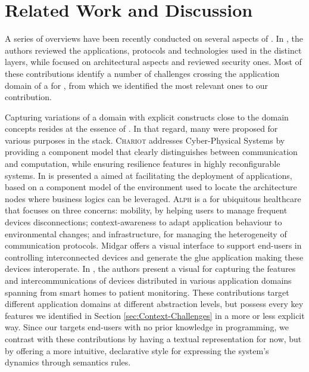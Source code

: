 \section{Related Work and Discussion}
\label{sec:RW}

A series of overviews have been recently conducted on several aspects of \IOT. In \cite{J:AlFuqaha-etAl:2014,xu-14a}, the authors reviewed the applications, protocols and technologies used in the distinct \IOT layers, while \cite{singh-14,gubbi-13} focused on architectural aspects and \cite{tan-10,xu-14b} reviewed security ones. Most of these contributions identify a number of challenges crossing the application domain of a \DSL for \IOT, from which we identified the most relevant ones to our contribution.

Capturing variations of a domain with explicit constructs close to the domain concepts resides at the essence of \DSLS. In that regard, many \DSLS were proposed for various purposes in the \IOT stack. \textsc{Chariot} \cite{Pradhan-etAl:2015} addresses Cyber-Physical Systems by providing a component model that clearly distinguishes between communication and computation, while ensuring resilience features in highly reconfigurable systems. In \cite{Brandzaeg-Mohagheghi-Mosser:2012} is presented a \DSL aimed at facilitating the deployment of applications, based on a component model of the environment used to locate the architecture nodes where business logics can be leveraged. \textsc{Alph} \cite{Munnelly-Clarke:2008} is a \DSL for ubiquitous healthcare that focuses on three concerns: mobility, by helping users to manage frequent devices disconnections; context-awareness to adapt application behaviour to environmental changes; and infrastructure, for managing the heterogeneity of communication protocols. Midgar \cite{J:Garcia-etAl:2014} offers a visual interface to support end-users in controlling interconnected devices and generate the glue application making these devices interoperate. In \cite{Salihbegovic-Eterovic-Kaljic-Ribic:2015}, the authors present a visual \DSL for capturing the features and intercommunications of devices distributed in various application domains spanning from smart homes to patient monitoring. These contributions target different application domains at different abstraction levels, but possess every key features we identified in Section \ref{sec:Context-Challenges} in a more or less explicit way. Since our \DSL targets end-users with no prior knowledge in programming, we contrast with these contributions by having a textual representation for now, but by offering a more intuitive, declarative style for expressing the system's dynamics through semantics rules.

